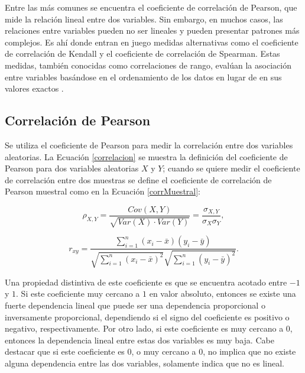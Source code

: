 Entre las más comunes se encuentra el coeficiente de correlación de Pearson, que mide la relación lineal entre dos variables. Sin embargo, en muchos casos, las relaciones entre variables pueden no ser lineales y pueden presentar patrones más complejos. Es ahí donde entran en juego medidas alternativas como el coeficiente de correlación de Kendall y el coeficiente de correlación de Spearman. Estas medidas, también conocidas como correlaciones de rango, evalúan la asociación entre variables basándose en el ordenamiento de los datos en lugar de en sus valores exactos \cite{czadoAnalyzing}.



\subsection{Correlación de Pearson}

Se utiliza el coeficiente de Pearson para medir la correlación entre dos variables aleatorias. La Ecuación \eqref{correlacion} se muestra la definición del coeficiente de Pearson para dos variables aleatorias $X$ y $Y$; cuando se quiere medir el coeficiente de correlación entre dos muestras se define el coeficiente de correlación de Pearson muestral como en la Ecuación \eqref{corrMuestral}:

\begin{equation}\label{correlacion}
    \rho_{X, Y} = \frac{Cov(X, Y)}{\sqrt{Var(X) \cdot Var(Y)}} = \frac{\sigma_{X, Y}}{\sigma_X \sigma_Y},
\end{equation}

\begin{equation}\label{corrMuestral}
    r_{x y}=\frac{\sum_{i=1}^n\left(x_i-\bar{x}\right)\left(y_i-\bar{y}\right)}{\sqrt{\sum_{i=1}^n\left(x_i-\bar{x}\right)^2} \sqrt{\sum_{i=1}^n\left(y_i-\bar{y}\right)^2}}.
\end{equation}

 Una propiedad distintiva de este coeficiente es que se encuentra acotado entre $-1$ y $1$. Si este coeficiente muy cercano a $1$ en valor absoluto, entonces se existe una fuerte dependencia lineal que puede ser una dependencia proporcional o inversamente proporcional, dependiendo si el signo del coeficiente es positivo o negativo, respectivamente. Por otro lado, si este coeficiente es muy cercano a 0, entonces la dependencia lineal entre estas dos variables es muy baja. Cabe destacar que si este coeficiente es $0$, o muy cercano a $0$, no implica que no existe alguna dependencia entre las dos variables, solamente indica que no es lineal.

